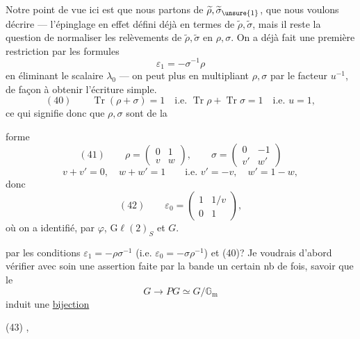 
Notre point de vue ici est que nous partons de $\widetilde\rho,\widetilde\sigma_{\unsure{1}}$, que nous voulons décrire --- l'épinglage  en effet défini déjà en termes de $\widetilde\rho,\widetilde\sigma$, mais il reste la question de normaliser les relèvements de $\widetilde\rho,\widetilde\sigma$ en $\rho,\sigma$. On a déjà fait une première restriction par les formules
\[
\varepsilon_1=-\sigma^{-1}\rho
\]
en éliminant le  scalaire $\lambda_0$ --- on peut  plus en multipliant $\rho,\sigma$ par le facteur $u^{-1}$, de façon à obtenir l'écriture simple.
\[
(40)\qquad\operatorname{Tr}(\rho+\sigma)=1\quad\text{i.e. }\operatorname{Tr}\rho+\operatorname{Tr}\sigma=1\quad\text{i.e. }u=1,
\]
ce qui signifie donc que $\rho,\sigma$ sont de la



forme
\[
(41)\qquad \rho=\begin{pmatrix}0&1\\v&w\end{pmatrix},\qquad
\sigma=\begin{pmatrix}0&-1\\v'&w'\end{pmatrix}
\]
\[
v+v'=0,\quad w+w'=1\qquad\text{i.e. }v'=-v,\quad w'=1-w,
\]
donc
\[
(42)\qquad\varepsilon_0=\begin{pmatrix}1&1/v\\0&1\end{pmatrix},
\]
où on a identifié, par $\varphi$, $\mathrm{G}\ell(2)_S$ et $G$.

 par les conditions $\varepsilon_1=-\rho\sigma^{-1}$ (i.e. $\varepsilon_0=-\sigma\rho^{-1}$) et (40)?
Je voudrais d'abord vérifier avec soin une assertion faite par la bande un certain nb de fois, savoir que le  
\[
G\longrightarrow PG\simeq G/\mathbb G_{\mathrm m}
\]
induit une \uline{bijection}

(43)\quad
{},

